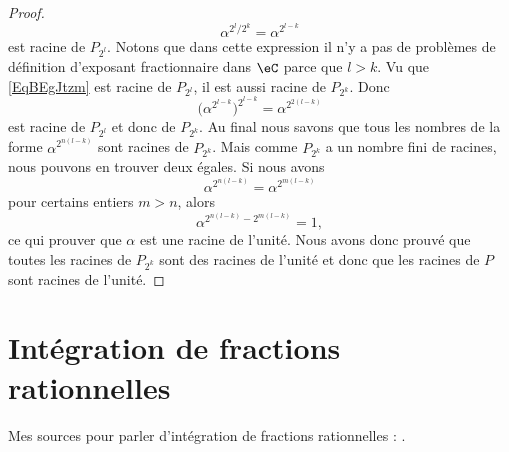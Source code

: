 \begin{proof}
    \begin{equation}    \label{EqBEgJtzm}
        \alpha^{2^l/2^k}=\alpha^{2^{l-k}}
    \end{equation}
    est racine de \( P_{2^l}\). Notons que dans cette expression il n'y a pas de problèmes de définition d'exposant fractionnaire dans \( \eC\) parce que \( l>k\). Vu que \eqref{EqBEgJtzm} est racine de \( P_{2^l}\), il est aussi racine de \( P_{2^k}\). Donc
    \begin{equation}
        \big( \alpha^{2^{l-k}} \big)^{2^{l-k}}=\alpha^{2^{2(l-k)}}
    \end{equation}
    est racine de \( P_{2^l}\) et donc de \( P_{2^k}\). Au final nous savons que tous les nombres de la forme \( \alpha^{2^{n(l-k)}}\) sont racines de \( P_{2^k}\). Mais comme \( P_{2^k}\) a un nombre fini de racines, nous pouvons en trouver deux égales. Si nous avons
    \begin{equation}
        \alpha^{2^{n(l-k)}}=\alpha^{2^{m(l-k)}}
    \end{equation}
    pour certains entiers \( m>n\), alors
    \begin{equation}
        \alpha^{2^{n(l-k)}-2^{m(l-k)}}=1,
    \end{equation}
    ce qui prouver que \( \alpha\) est une racine de l'unité. Nous avons donc prouvé que toutes les racines de \( P_{2^k}\) sont des racines de l'unité et donc que les racines de \( P\) sont racines de l'unité.
    
\end{proof}

\section{Intégration de fractions rationnelles}

Mes sources pour parler d'intégration de fractions rationnelles : \cite{MKucxNb,CPheFRq,LTjwacY,KXjFWKA}.

